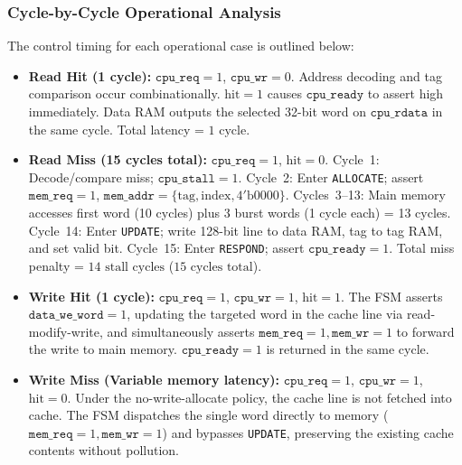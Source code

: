 \subsubsection{Cycle-by-Cycle Operational Analysis}
The control timing for each operational case is outlined below:
\begin{itemize}
    \item \textbf{Read Hit (1 cycle):} $\texttt{cpu\_req} = 1$, $\texttt{cpu\_wr} = 0$.
          Address decoding and tag comparison occur combinationally. $\mathrm{hit} = 1$
          causes $\texttt{cpu\_ready}$ to assert high immediately. Data RAM
          outputs the selected 32-bit word on $\texttt{cpu\_rdata}$ in the same cycle.
          Total latency = $1\text{ cycle}$.
    \item \textbf{Read Miss (15 cycles total):} $\texttt{cpu\_req} = 1$, $\mathrm{hit} = 0$.
          Cycle~1: Decode/compare miss; $\texttt{cpu\_stall} = 1$.
          Cycle~2: Enter \texttt{ALLOCATE}; assert $\texttt{mem\_req} = 1$,
          $\texttt{mem\_addr} = \{\mathrm{tag}, \mathrm{index}, 4'\mathrm{b}0000\}$.
          Cycles~3--13: Main memory accesses first word (10 cycles) plus 3 burst words
          (1 cycle each) = 13 cycles.
          Cycle~14: Enter \texttt{UPDATE}; write 128-bit line to data RAM, tag to tag RAM,
          and set valid bit.
          Cycle~15: Enter \texttt{RESPOND}; assert $\texttt{cpu\_ready} = 1$.
          Total miss penalty = $14\text{ stall cycles}$ ($15\text{ cycles total}$).
    \item \textbf{Write Hit (1 cycle):} $\texttt{cpu\_req} = 1$, $\texttt{cpu\_wr} = 1$,
          $\mathrm{hit} = 1$. The FSM asserts $\texttt{data\_we\_word} = 1$, updating
          the targeted word in the cache line via read-modify-write, and simultaneously
          asserts $\texttt{mem\_req} = 1, \texttt{mem\_wr} = 1$ to forward the write
          to main memory. $\texttt{cpu\_ready} = 1$ is returned in the same cycle.
    \item \textbf{Write Miss (Variable memory latency):} $\texttt{cpu\_req} = 1$,
          $\texttt{cpu\_wr} = 1$, $\mathrm{hit} = 0$. Under the no-write-allocate
          policy, the cache line is not fetched into cache. The FSM dispatches
          the single word directly to memory ($\texttt{mem\_req} = 1, \texttt{mem\_wr} = 1$)
          and bypasses \texttt{UPDATE}, preserving the existing cache contents without
          pollution.
\end{itemize}


